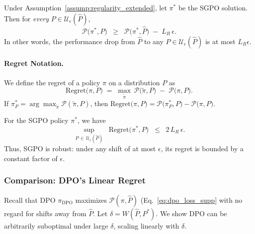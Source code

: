 \begin{theorem}
\label{thm:sgpo_regret_bound}
Under Assumption~\ref{assump:regularity_extended}, let $\pi^*$ be the SGPO solution.  Then for \emph{every} $P\in \mathcal{U}_\epsilon(\hat{P})$,
\begin{equation}
\mathcal{P}\bigl(\pi^*,P\bigr)
\;\;\ge\;\;
\mathcal{P}\bigl(\pi^*,\hat{P}\bigr)
\;-\;
L_R\,\epsilon.
\end{equation}
In other words, the performance drop from $\hat{P}$ to any $P\in \mathcal{U}_\epsilon(\hat{P})$ is at most $L_R\epsilon$.
\end{theorem}

\paragraph{Regret Notation.}
We define the regret of a policy $\pi$ on a distribution $P$ as
\begin{equation}
\text{Regret}\bigl(\pi,P\bigr)
\;=\;
\max_{\tilde{\pi}}\,\mathcal{P}\!\bigl(\tilde{\pi},P\bigr)
\;-\;
\mathcal{P}\!\bigl(\pi,P\bigr).
\end{equation}
If $\pi_P^*=\arg\max_{\tilde{\pi}}\mathcal{P}(\tilde{\pi},P)$, then
$\text{Regret}\bigl(\pi,P\bigr)=\mathcal{P}\bigl(\pi_P^*,P\bigr)-\mathcal{P}\bigl(\pi,P\bigr).$

\begin{theorem}
\label{thm:sgpo_regret}
For the SGPO policy $\pi^*$, we have
\begin{equation}
\sup_{P \,\in\,\mathcal{U}_\epsilon(\hat{P})}
\;\;
\text{Regret}\bigl(\pi^*,P\bigr)
\;\;\le\;\;
2\,L_R\,\epsilon.
\end{equation}
Thus, SGPO is robust: under any shift of at most $\epsilon$, its regret is bounded by a constant factor of $\epsilon$.
\end{theorem}

\subsubsection{Comparison: DPO’s Linear Regret}
\label{sec:compare_dpo}

Recall that DPO $\pi_{\mathrm{DPO}}$ \citep{Rafailov2023Direct} maximizes $\mathcal{P}(\pi,\hat{P})$ (Eq.~\eqref{eq:dpo_loss_supp} with no regard for shifts away from $\hat{P}$.  Let $\delta = W(\hat{P},P^*)$.  We show DPO can be arbitrarily suboptimal under large $\delta$, scaling linearly with $\delta$.

